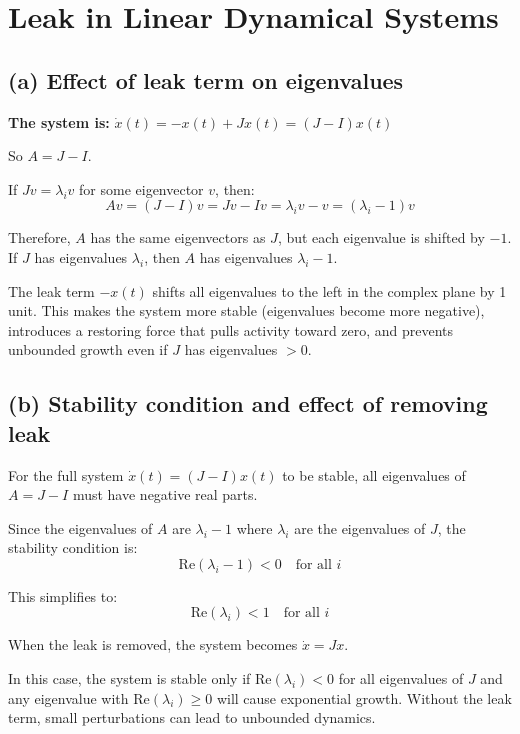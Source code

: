 \documentclass[11pt]{article}
\begin{document}
\section{Leak in Linear Dynamical Systems}

\subsection*{(a) Effect of leak term on eigenvalues}

\textbf{The system is:} $\dot{x}(t) = -x(t) + Jx(t) = (J - I)x(t)$

So $A = J - I$.

If $Jv = \lambda_i v$ for some eigenvector $v$, then:
\begin{equation}
Av = (J - I)v = Jv - Iv = \lambda_i v - v = (\lambda_i - 1)v
\end{equation}

Therefore, $A$ has the same eigenvectors as $J$, but each eigenvalue is shifted by $-1$. 
If $J$ has eigenvalues $\lambda_i$, then $A$ has eigenvalues $\lambda_i - 1$.




The leak term $-x(t)$ shifts all eigenvalues to the left in the complex plane by 1 unit. 
This makes the system more stable (eigenvalues become more negative), introduces a restoring force that pulls activity toward zero, and prevents unbounded growth even if $J$ has eigenvalues $> 0$.


\subsection*{(b) Stability condition and effect of removing leak}

For the full system $\dot{x}(t) = (J - I)x(t)$ to be stable, all eigenvalues of $A = J - I$ must have negative real parts.

Since the eigenvalues of $A$ are $\lambda_i - 1$ where $\lambda_i$ are the eigenvalues of $J$, the stability condition is:
\begin{equation}
\text{Re}(\lambda_i - 1) < 0 \quad \text{for all } i
\end{equation}

This simplifies to:
\begin{equation}
\text{Re}(\lambda_i) < 1 \quad \text{for all } i
\end{equation}


When the leak is removed, the system becomes $\dot{x} = Jx$.

In this case, the system is stable only if $\text{Re}(\lambda_i) < 0$ for all eigenvalues of $J$ and any eigenvalue with $\text{Re}(\lambda_i) \geq 0$ will cause exponential growth. 
    Without the leak term, small perturbations can lead to unbounded dynamics.
\end{document}
